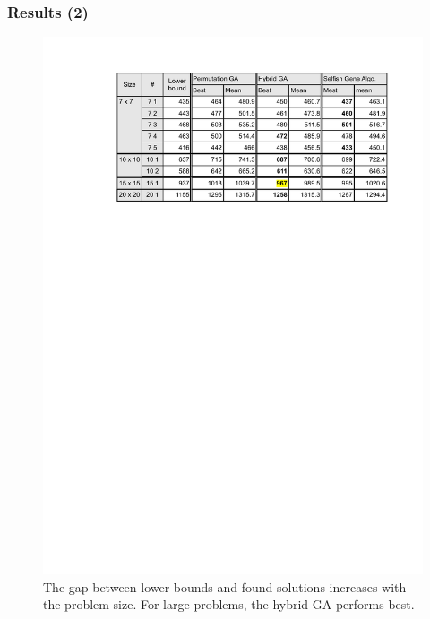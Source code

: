 
\begin{frame}
  \frametitle{Results (2)}

\begin{figure}[htbp]
	\centering
		\includegraphics[scale=.5]{images/results2.pdf}
	\caption{The gap between lower bounds and found solutions increases with the problem size. For large problems, the hybrid GA performs best.}
	\label{fig:label}
\end{figure}
\end{frame}


